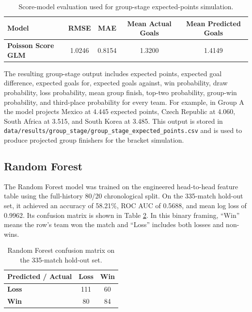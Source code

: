 \documentclass[11pt]{article}
\newcommand{\codepath}[1]{\nolinkurl{#1}}
\begin{document}
\begin{table}[h!]
\centering
\begin{tabular}{lcccc}
\hline
\textbf{Model} & \textbf{RMSE} & \textbf{MAE} & \textbf{Mean Actual Goals} & \textbf{Mean Predicted Goals} \\
\hline
\textbf{Poisson Score GLM} & 1.0246 & 0.8154 & 1.3200 & 1.4149 \\
\hline
\end{tabular}
\caption{Score-model evaluation used for group-stage expected-points simulation.}
\label{tab:score_model_metrics}
\end{table}

The resulting group-stage output includes expected points, expected goal difference, expected goals for, expected goals against, win probability, draw probability, loss probability, mean group finish, top-two probability, group-win probability, and third-place probability for every team. For example, in Group A the model projects Mexico at 4.445 expected points, Czech Republic at 4.060, South Africa at 3.515, and South Korea at 3.485. This output is stored in \codepath{data/results/group_stage/group_stage_expected_points.csv} and is used to produce projected group finishers for the bracket simulation.

\subsection{Random Forest}

The Random Forest model was trained on the engineered head-to-head feature table using the full-history 80/20 chronological split. On the 335-match hold-out set, it achieved an accuracy of 58.21\%, ROC AUC of 0.5688, and mean log loss of 0.9962. Its confusion matrix is shown in Table \ref{tab:rf_confusion}. In this binary framing, ``Win'' means the row's team won the match and ``Loss'' includes both losses and non-wins.

\begin{table}[h!]
\centering
\begin{tabular}{lcc}
\hline
\textbf{Predicted / Actual} & \textbf{Loss} & \textbf{Win} \\
\hline
\textbf{Loss} & 111 & 60 \\
\textbf{Win}  & 80  & 84 \\
\hline
\end{tabular}
\caption{Random Forest confusion matrix on the 335-match hold-out set.}
\label{tab:rf_confusion}
\end{table}
\end{document}
